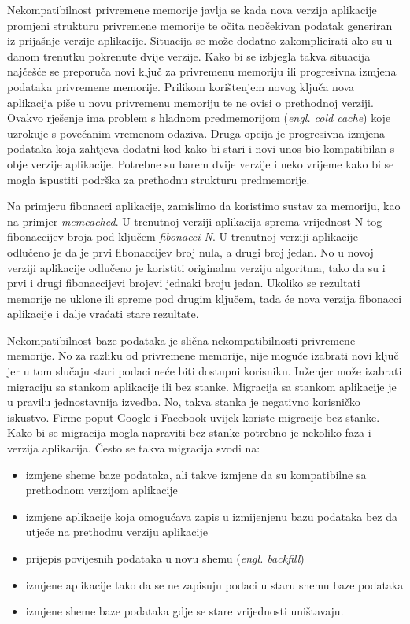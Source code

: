 Nekompatibilnost privremene memorije javlja se kada nova verzija aplikacije promjeni strukturu
privremene memorije te očita neočekivan podatak generiran iz prijašnje verzije aplikacije. Situacija
se može dodatno zakomplicirati ako su u danom trenutku pokrenute dvije verzije. Kako bi se izbjegla
takva situacija najčešće se preporuča novi ključ za privremenu memoriju ili progresivna izmjena
podataka privremene memorije. Prilikom korištenjem novog ključa nova aplikacija piše u novu
privremenu memoriju te ne ovisi o prethodnoj verziji. Ovakvo rješenje ima problem s hladnom
predmemorijom (\textit{engl. cold cache}) koje uzrokuje s povećanim vremenom odaziva. Druga opcija
je progresivna izmjena podataka koja zahtjeva dodatni kod kako bi stari i novi unos bio kompatibilan
s obje verzije aplikacije. Potrebne su barem dvije verzije i neko vrijeme kako bi se mogla ispustiti
podrška za prethodnu strukturu predmemorije.

Na primjeru fibonacci aplikacije, zamislimo da koristimo sustav za memoriju, kao na primjer
\textit{memcached}. U trenutnoj verziji aplikacija sprema vrijednost N-tog fibonaccijev broja pod
ključem \textit{fibonacci-N}. U trenutnoj verziji aplikacije odlučeno je da je prvi fibonaccijev
broj nula, a drugi broj jedan. No u novoj verziji aplikacije odlučeno je koristiti originalnu
verziju algoritma, tako da su i prvi i drugi fibonaccijevi brojevi jednaki broju jedan. Ukoliko se
rezultati memorije ne uklone ili spreme pod drugim ključem, tada će nova verzija fibonacci
aplikacije i dalje vraćati stare rezultate.

Nekompatibilnost baze podataka je slična nekompatibilnosti privremene memorije. No za razliku od
privremene memorije, nije moguće izabrati novi ključ jer u tom slučaju stari podaci neće biti
dostupni korisniku. Inženjer može izabrati migraciju sa stankom aplikacije ili bez stanke. Migracija
sa stankom aplikacije je u pravilu jednostavnija izvedba. No, takva stanka je negativno korisničko
iskustvo. Firme poput Google i Facebook uvijek koriste migracije bez stanke. Kako bi se migracija
mogla napraviti bez stanke potrebno je nekoliko faza i verzija aplikacija. Često se takva migracija
svodi na:
\begin{itemize}
    \item izmjene sheme baze podataka, ali takve izmjene da su kompatibilne sa prethodnom verzijom
        aplikacije
    \item izmjene aplikacije koja omogućava zapis u izmijenjenu bazu podataka bez da utječe na
        prethodnu verziju aplikacije
    \item prijepis povijesnih podataka u novu shemu (\textit{engl. backfill})
    \item izmjene aplikacije tako da se ne zapisuju podaci u staru shemu baze podataka
    \item izmjene sheme baze podataka gdje se stare vrijednosti uništavaju.
\end{itemize}

